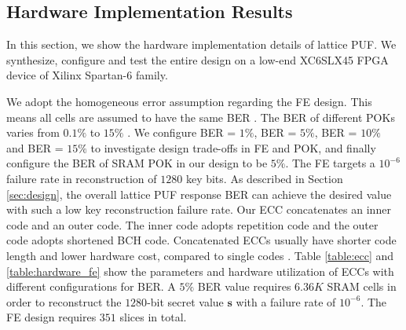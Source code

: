 \subsection{Hardware Implementation Results}
\label{sec:hardware_results}

In this section, we show the hardware implementation details of lattice PUF. We synthesize, configure and test the entire design on a low-end XC6SLX45 FPGA device of Xilinx Spartan-6 family.  

We adopt the homogeneous error assumption regarding the FE design. This means all cells are assumed to have the same BER \cite{bosch2008efficient}.
The BER of different POKs varies from $0.1\%$ \cite{karpinskyy20168} to $15\%$ \cite{maes2009soft}.
We configure BER = $1\%$, BER = $5\%$, BER = $10\%$ and BER = $15\%$ to investigate design trade-offs in FE and POK, and finally configure the BER of SRAM POK in our design to be $5\%$. The FE targets a $10^{-6}$ failure rate in reconstruction of $1280$ key bits. 
As described in Section \ref{sec:design}, the overall lattice PUF response BER can achieve the desired value with such a low key reconstruction failure rate.
Our ECC concatenates an inner code and an outer code. The inner code adopts repetition code and the outer code adopts shortened BCH code. Concatenated ECCs usually have shorter code length and lower hardware cost, compared to single codes \cite{bosch2008efficient}.
Table \ref{table:ecc} and \ref{table:hardware_fe} show the parameters and hardware utilization of ECCs with different configurations for BER.
A $5\%$ BER value requires $6.36K$ SRAM cells in order to reconstruct the $1280$-bit secret value $\mathbf{s}$ with a failure rate of $10^{-6}$.
The FE design requires $351$ slices in total.


